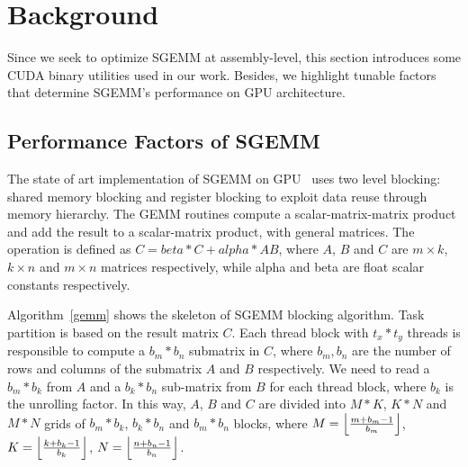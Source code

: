 \section{Background}
\label{sec:background}
Since we seek to optimize SGEMM at assembly-level, this section introduces some CUDA binary utilities used in our work. 
Besides, we highlight tunable factors that determine SGEMM's performance on GPU architecture.

\subsection{Performance Factors of SGEMM}
\label{sec:sgemm}
The state of art implementation of SGEMM on GPU~\cite{magma,nervana_sgemm_wiki,lai,tan} uses two level blocking:
shared memory blocking and register blocking to exploit data reuse through memory hierarchy.
The GEMM routines compute a scalar-matrix-matrix product and add the result to
a scalar-matrix product, with general matrices. The operation is defined as $C
= beta*C + alpha*AB$, where $A$, $B$ and $C$ are $m\times k$, $k\times n$ and
$m\times n$ matrices respectively, while alpha and beta are float scalar constants respectively.

Algorithm~\ref{gemm} shows the skeleton of SGEMM blocking algorithm. Task partition is based on the result matrix $C$. 
Each thread block with $t_x*t_y$ threads is responsible to compute a $b_m*b_n$ submatrix in $C$, where $b_m, b_n$ are the 
number of rows and columns of the submatrix $A$ and $B$ respectively. We need to read a $b_m*b_k$ from $A$ and a $b_k*b_n$ sub-matrix from 
$B$ for each thread block, where $b_k$ is the unrolling factor. In this way, $A$, $B$ and $C$ are divided into $M*K$, $K*N$ and 
$M*N$ grids of $b_m*b_k$, $b_k*b_n$ and $b_m*b_n$ blocks, where $M=\Bigl\lfloor \frac{m+b_m-1}{b_m} \Bigr\rfloor$, 
$K=\Bigl\lfloor \frac{k+b_k-1}{b_k} \Bigr\rfloor$, $N=\Bigl\lfloor \frac{n+b_n-1}{b_n} \Bigr\rfloor$.

